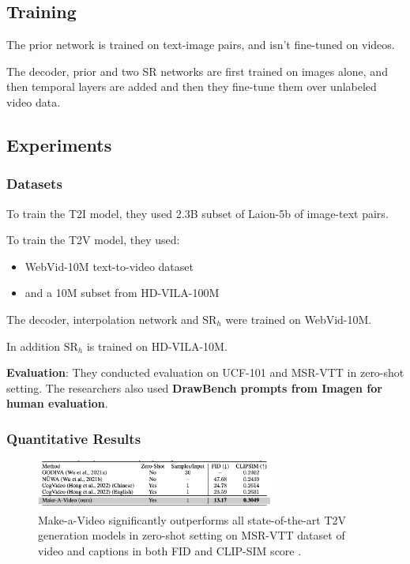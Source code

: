 \subsection{Training}

The prior network is trained on text-image pairs, and isn't fine-tuned on videos.

The decoder, prior and two SR networks are first trained on images alone, and then temporal layers are added and then they fine-tune them over unlabeled video data.





\subsection{Experiments}

\subsubsection{Datasets}

To train the T2I model, they used 2.3B subset of Laion-5b \cite{laion_5b} of image-text pairs.

To train the T2V model, they used:
\begin{itemize}
    \item WebVid-10M \cite{webvid_10m} text-to-video dataset
    \item and a 10M subset from HD-VILA-100M \cite{hd_vila_100m}
\end{itemize}

The decoder, interpolation network and $\text{SR}_h$ were trained on WebVid-10M.

In addition $\text{SR}_h$ is trained on HD-VILA-10M.

\textbf{Evaluation}: They conducted evaluation on UCF-101 \cite{ucf_101} and MSR-VTT \cite{msr_vtt} in zero-shot setting. The researchers also used \textbf{DrawBench prompts from Imagen for human evaluation}.



\subsubsection{Quantitative Results}

\begin{figure}[h]
    \centering
    \includegraphics[width=0.7\textwidth]{images/make_a_video/zero_shot_eval.png}
    \caption{Make-a-Video significantly outperforms all state-of-the-art T2V generation models in zero-shot setting on MSR-VTT \cite{msr_vtt} dataset of video  and captions in both FID and CLIP-SIM score \cite{make_a_video}.}
    \label{fig:make_a_video_zeroshot_eval}
\end{figure}

